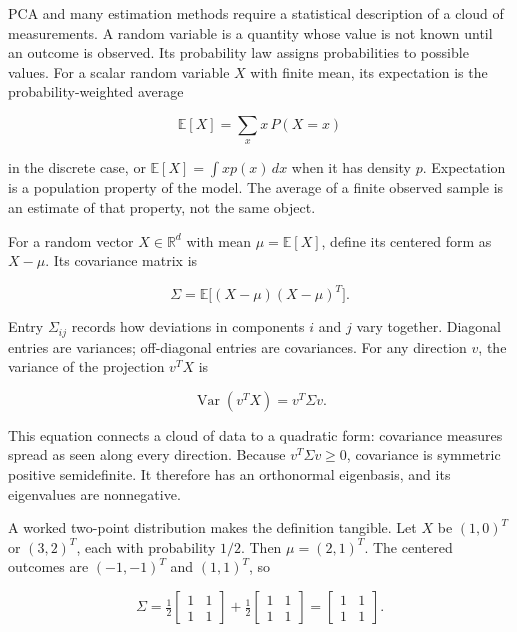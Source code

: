 \hypertarget{02-foundations-ii-ch022-random-measurements-expectation-and-covariance}{}

PCA and many estimation methods require a statistical description of a cloud of measurements. A random variable is a quantity whose value is not known until an outcome is observed. Its probability law assigns probabilities to possible values. For a scalar random variable \(X\) with finite mean, its expectation is the probability-weighted average

\[
\mathbb E[X]=\sum_x x\,P(X=x)
\]

in the discrete case, or \(\mathbb E[X]=\int x p(x)\,dx\) when it has density \(p\). Expectation is a population property of the model. The average of a finite observed sample is an estimate of that property, not the same object.

For a random vector \(X\in\mathbb R^d\) with mean \(\mu=\mathbb E[X]\), define its centered form as \(X-\mu\). Its covariance matrix is

\[
\Sigma=\mathbb E\big[(X-\mu)(X-\mu)^T\big].
\]

Entry \(\Sigma_{ij}\) records how deviations in components \(i\) and \(j\) vary together. Diagonal entries are variances; off-diagonal entries are covariances. For any direction \(v\), the variance of the projection \(v^TX\) is

\[
\operatorname{Var}(v^TX)=v^T\Sigma v.
\]

This equation connects a cloud of data to a quadratic form: covariance measures spread as seen along every direction. Because \(v^T\Sigma v\ge 0\), covariance is symmetric positive semidefinite. It therefore has an orthonormal eigenbasis, and its eigenvalues are nonnegative.

A worked two-point distribution makes the definition tangible. Let \(X\) be \((1,0)^T\) or \((3,2)^T\), each with probability \(1/2\). Then \(\mu=(2,1)^T\). The centered outcomes are \((-1,-1)^T\) and \((1,1)^T\), so

\[
\Sigma=\tfrac12\begin{bmatrix}1&1\\1&1\end{bmatrix}
+\tfrac12\begin{bmatrix}1&1\\1&1\end{bmatrix}
=\begin{bmatrix}1&1\\1&1\end{bmatrix}.
\]

